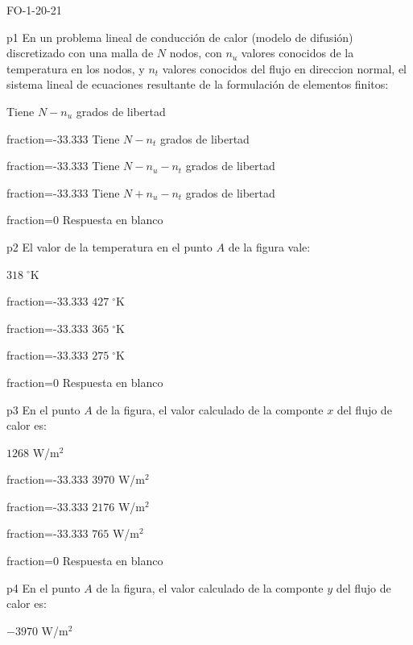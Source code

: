 \documentclass[a4paper]{article}
\begin{document}
	
\begin{quiz}{FO-1-20-21}

\begin{multi}{p1}
En un problema lineal de conducci\'on de calor (modelo de difusi\'on) discretizado con
una malla de $N$ nodos, con $n_u$ valores conocidos de la temperatura en los
nodos, y $n_t$ valores conocidos del flujo en direccion normal, el sistema
lineal de ecuaciones resultante de la formulaci\'on de elementos finitos:
\item* Tiene $N-n_u$ grados de libertad
\item[fraction=-33.333] Tiene $N-n_t$ grados de libertad
\item[fraction=-33.333] Tiene $N-n_u-n_t$ grados de libertad
\item[fraction=-33.333] Tiene $N+n_u-n_t$ grados de libertad
\item[fraction=0] Respuesta en blanco
\end{multi}
\begin{multi}{p2}
El valor de la temperatura en el punto $A$ de la figura vale:
\item* $318 \; ^{\circ}$K
\item[fraction=-33.333] $427 \; ^{\circ}$K
\item[fraction=-33.333] $365 \; ^{\circ}$K
\item[fraction=-33.333] $275 \; ^{\circ}$K
\item[fraction=0] Respuesta en blanco
\end{multi}
\begin{multi}{p3}
En el punto $A$ de la figura, el valor calculado de la componte $x$ del flujo de calor es:
\item* $1268$ W/m$^2$
\item[fraction=-33.333] $3970$ W/m$^2$
\item[fraction=-33.333] $2176$ W/m$^2$
\item[fraction=-33.333] $765$ W/m$^2$
\item[fraction=0] Respuesta en blanco
\end{multi}
\begin{multi}{p4}
En el punto $A$ de la figura, el valor calculado de la componte $y$ del flujo de calor es:
\item* $-3970$ W/m$^2$

\end{multi}
\end{quiz}
\end{document}
